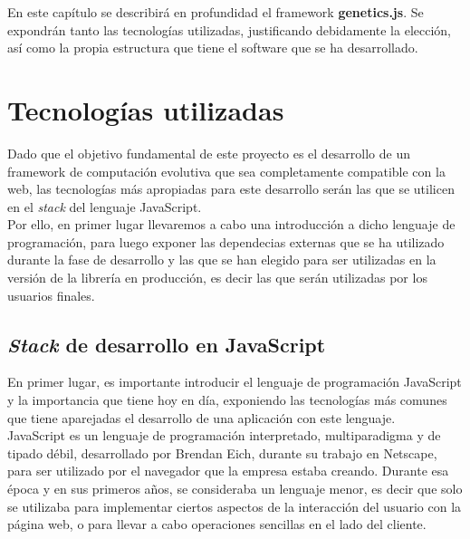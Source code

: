 



En este capítulo se describirá en profundidad el framework \textbf{genetics.js}. Se expondrán tanto las tecnologías utilizadas, justificando debidamente la elección, así como la propia estructura que tiene el software que se ha desarrollado.

\section{Tecnologías utilizadas}
\label{4:sec:1}

Dado que el objetivo fundamental de este proyecto es el desarrollo de un framework de computación evolutiva que sea completamente compatible con la web, las tecnologías más apropiadas para este desarrollo serán las que se utilicen en el \textit{stack} del lenguaje JavaScript. \\

Por ello, en primer lugar llevaremos a cabo una introducción a dicho lenguaje de programación, para luego exponer las dependecias externas que se ha utilizado durante la fase de desarrollo y las que se han elegido para ser utilizadas en la versión de la librería en producción, es decir las que serán utilizadas por los usuarios finales. 

\subsection{\textit{Stack} de desarrollo en JavaScript}

En primer lugar, es importante introducir el lenguaje de programación JavaScript y la importancia que tiene hoy en día, exponiendo las tecnologías más comunes que tiene aparejadas el desarrollo de una aplicación con este lenguaje. \\

JavaScript es un lenguaje de programación interpretado, multiparadigma y de tipado débil, desarrollado por Brendan Eich, durante su trabajo en Netscape, para ser utilizado por el navegador que la empresa estaba creando. Durante esa época y en sus primeros años, se consideraba un lenguaje menor, es decir que solo se utilizaba para implementar ciertos aspectos de la interacción del usuario con la página web, o para llevar a cabo operaciones sencillas en el lado del cliente. \\


